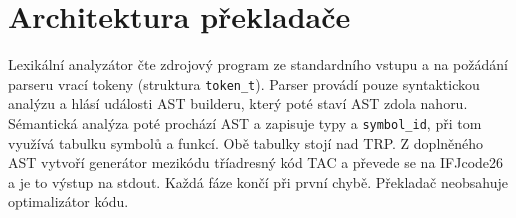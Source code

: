 \documentclass[a4paper,11pt]{article}
\begin{document}
\section{Architektura překladače}

Lexikální analyzátor čte zdrojový program ze standardního vstupu a na požádání parseru vrací tokeny (struktura \texttt{token\_t}). Parser provádí pouze syntaktickou analýzu a hlásí události AST builderu, který poté staví AST zdola nahoru. Sémantická analýza poté prochází AST a zapisuje typy a \verb|symbol_id|, při tom využívá tabulku symbolů a funkcí. Obě tabulky stojí nad TRP. Z doplněného AST vytvoří generátor mezikódu tříadresný kód TAC a převede se na IFJcode26 a je to výstup na stdout. Každá fáze končí při první chybě. Překladač neobsahuje optimalizátor kódu.
 
\end{document}
